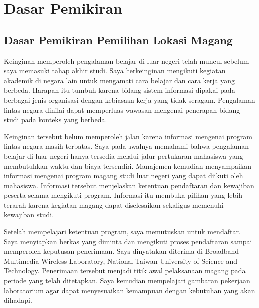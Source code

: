 \chapter{Dasar Pemikiran}

\section{Dasar Pemikiran Pemilihan Lokasi Magang}

Keinginan memperoleh pengalaman belajar di luar negeri telah muncul sebelum
saya memasuki tahap akhir studi. Saya berkeinginan mengikuti kegiatan akademik
di negara lain untuk mengamati cara belajar dan cara kerja yang berbeda.
Harapan itu tumbuh karena bidang sistem informasi dipakai pada berbagai jenis
organisasi dengan kebiasaan kerja yang tidak seragam. Pengalaman lintas negara
dinilai dapat memperluas wawasan mengenai penerapan bidang studi pada konteks
yang berbeda.

Keinginan tersebut belum memperoleh jalan karena informasi mengenai program
lintas negara masih terbatas. Saya pada awalnya memahami bahwa pengalaman
belajar di luar negeri hanya tersedia melalui jalur pertukaran mahasiswa yang
membutuhkan waktu dan biaya tersendiri. Manajemen \NamaKampus{} kemudian
menyampaikan informasi mengenai program magang studi luar negeri yang dapat
diikuti oleh mahasiswa. Informasi tersebut menjelaskan ketentuan pendaftaran
dan kewajiban peserta selama mengikuti program. Informasi itu membuka pilihan
yang lebih terarah karena kegiatan magang dapat diselesaikan sekaligus
memenuhi kewajiban studi.

Setelah mempelajari ketentuan program, saya memutuskan untuk mendaftar. Saya
menyiapkan berkas yang diminta dan mengikuti proses pendaftaran sampai
memperoleh keputusan penerimaan. Saya dinyatakan diterima di Broadband
Multimedia Wireless Laboratory, National Taiwan University of Science and
Technology. Penerimaan tersebut menjadi titik awal pelaksanaan magang pada
periode yang telah ditetapkan. Saya kemudian mempelajari gambaran pekerjaan
laboratorium agar dapat menyesuaikan kemampuan dengan kebutuhan yang akan
dihadapi.

